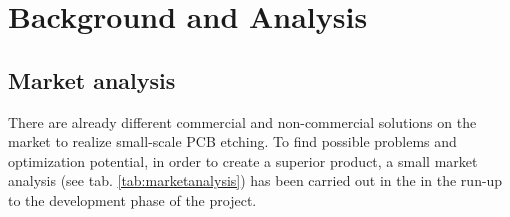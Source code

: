 
\chapter{Background and Analysis}
\label{chap:background}

\section{Market analysis}
\label{sec:marketanalysis}
There are already different commercial and non-commercial solutions on the market to realize small-scale \gls{PCB} etching. To find possible problems and optimization potential, in order to create a superior product, a small market analysis (see tab. \ref{tab:marketanalysis}) has been carried out in the in the run-up to the development phase of the project. 

